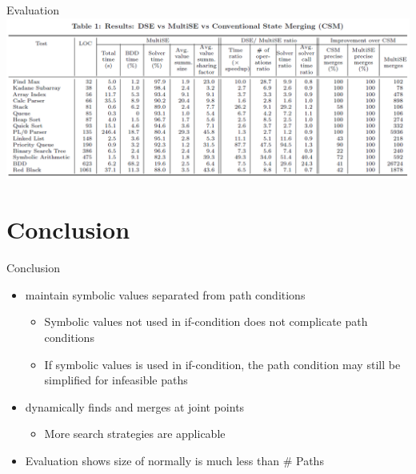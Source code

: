 \documentclass[xcolor={dvipsnames,table},16pt]{beamer}
\begin{document}
\begin{frame}{Evaluation}
    \includegraphics[width=\textwidth]{evaluation.png}
	\begin{itemize}
	\end{itemize}
\end{frame}

\section{Conclusion}

\begin{frame}{Conclusion}
	\begin{itemize}
		\item \ValSums maintain symbolic values separated from path conditions
		\begin{itemize}
			\myopinion
			\item Symbolic values not used in if-condition does not complicate
			      path conditions
			\item If symbolic values is used in if-condition,
			      the path condition may still be simplified for infeasible paths
		\end{itemize}
		\item \MultiSE dynamically finds and merges at joint points
		\begin{itemize}
			\myopinion
			\item More search strategies are applicable
		\end{itemize}

		\item Evaluation shows size of \ValSums normally is much less than \# Paths
	\end{itemize} 
\end{frame}
\end{document}

